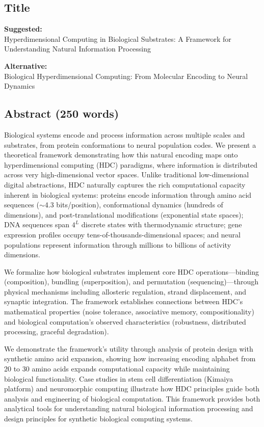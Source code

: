 \documentclass[11pt]{article}
\begin{document}
\subsection{Title}

\textbf{Suggested:}\\
\textcolor{keep}{Hyperdimensional Computing in Biological Substrates: A Framework for Understanding Natural Information Processing}

\textbf{Alternative:}\\
\textcolor{keep}{Biological Hyperdimensional Computing: From Molecular Encoding to Neural Dynamics}

\subsection{Abstract (250 words)}

\begin{tcolorbox}[colback=keep!10,colframe=keep,title=New Abstract Template]
Biological systems encode and process information across multiple scales and substrates, from protein conformations to neural population codes. We present a theoretical framework demonstrating how this natural encoding maps onto hyperdimensional computing (HDC) paradigms, where information is distributed across very high-dimensional vector spaces. Unlike traditional low-dimensional digital abstractions, HDC naturally captures the rich computational capacity inherent in biological systems: proteins encode information through amino acid sequences ($\sim$4.3 bits/position), conformational dynamics (hundreds of dimensions), and post-translational modifications (exponential state spaces); DNA sequences span $4^L$ discrete states with thermodynamic structure; gene expression profiles occupy tens-of-thousands-dimensional spaces; and neural populations represent information through millions to billions of activity dimensions.

We formalize how biological substrates implement core HDC operations—binding (composition), bundling (superposition), and permutation (sequencing)—through physical mechanisms including allosteric regulation, strand displacement, and synaptic integration. The framework establishes connections between HDC's mathematical properties (noise tolerance, associative memory, compositionality) and biological computation's observed characteristics (robustness, distributed processing, graceful degradation).

We demonstrate the framework's utility through analysis of protein design with synthetic amino acid expansion, showing how increasing encoding alphabet from 20 to 30 amino acids expands computational capacity while maintaining biological functionality. Case studies in stem cell differentiation (Kimaiya platform) and neuromorphic computing illustrate how HDC principles guide both analysis and engineering of biological computation. This framework provides both analytical tools for understanding natural biological information processing and design principles for synthetic biological computing systems.
\end{tcolorbox}
\end{document}
